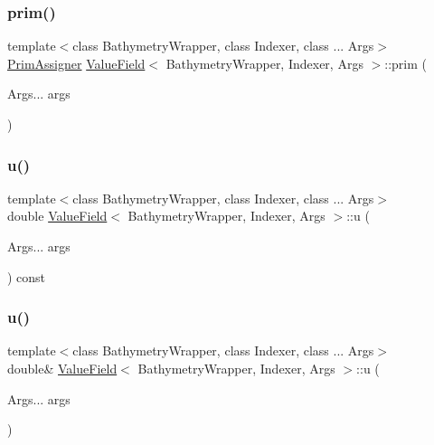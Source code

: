 \mbox{\label{structValueField_abe27b143ed688cf5cd9bfb8bc596ab9c}} 
\subsubsection{\texorpdfstring{prim()}{prim()}\hspace{0.1cm}{\footnotesize\ttfamily [2/2]}}
{\footnotesize\ttfamily template$<$class Bathymetry\+Wrapper, class Indexer, class ... Args$>$ \\
\hyperlink{structPrimAssigner}{Prim\+Assigner} \hyperlink{structValueField}{Value\+Field}$<$ Bathymetry\+Wrapper, Indexer, Args $>$\+::prim (\begin{DoxyParamCaption}\item[{Args...}]{args }\end{DoxyParamCaption})\hspace{0.3cm}{\ttfamily [inline]}}

\mbox{\label{structValueField_a7a94024fc87e8f52448f7bc3d0b4274b}} 
\subsubsection{\texorpdfstring{u()}{u()}\hspace{0.1cm}{\footnotesize\ttfamily [1/2]}}
{\footnotesize\ttfamily template$<$class Bathymetry\+Wrapper, class Indexer, class ... Args$>$ \\
double \hyperlink{structValueField}{Value\+Field}$<$ Bathymetry\+Wrapper, Indexer, Args $>$\+::u (\begin{DoxyParamCaption}\item[{Args...}]{args }\end{DoxyParamCaption}) const\hspace{0.3cm}{\ttfamily [inline]}}

\mbox{\label{structValueField_a77a0c7ddc3ad5cbf583ccb6d631ecf02}} 
\subsubsection{\texorpdfstring{u()}{u()}\hspace{0.1cm}{\footnotesize\ttfamily [2/2]}}
{\footnotesize\ttfamily template$<$class Bathymetry\+Wrapper, class Indexer, class ... Args$>$ \\
double\& \hyperlink{structValueField}{Value\+Field}$<$ Bathymetry\+Wrapper, Indexer, Args $>$\+::u (\begin{DoxyParamCaption}\item[{Args...}]{args }\end{DoxyParamCaption})\hspace{0.3cm}{\ttfamily [inline]}}

